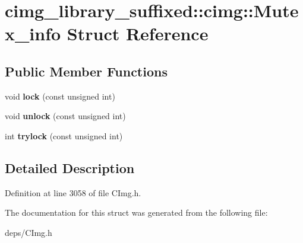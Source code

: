 \hypertarget{structcimg__library__suffixed_1_1cimg_1_1Mutex__info}{}\section{cimg\+\_\+library\+\_\+suffixed\+:\+:cimg\+:\+:Mutex\+\_\+info Struct Reference}
\label{structcimg__library__suffixed_1_1cimg_1_1Mutex__info}
\subsection*{Public Member Functions}
\begin{DoxyCompactItemize}
\item 
\mbox{\label{structcimg__library__suffixed_1_1cimg_1_1Mutex__info_a6cc8e26847a1aa649febed03d70182e7}} 
void {\bfseries lock} (const unsigned int)
\item 
\mbox{\label{structcimg__library__suffixed_1_1cimg_1_1Mutex__info_afac3fa5f107ad4795fb867050f616555}} 
void {\bfseries unlock} (const unsigned int)
\item 
\mbox{\label{structcimg__library__suffixed_1_1cimg_1_1Mutex__info_a9bf4ed1e1dfe6f28fa6250cd04f3c900}} 
int {\bfseries trylock} (const unsigned int)
\end{DoxyCompactItemize}


\subsection{Detailed Description}


Definition at line 3058 of file C\+Img.\+h.



The documentation for this struct was generated from the following file\+:\begin{DoxyCompactItemize}
\item 
deps/C\+Img.\+h\end{DoxyCompactItemize}
